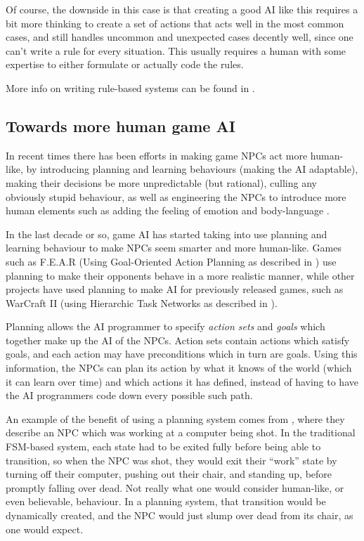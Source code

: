 \documentclass[]{report}
\begin{document}
Of course, the downside in this case is that creating a good AI like this
requires a bit more thinking to create a set of actions that acts well in the
most common cases, and still handles uncommon and unexpected cases decently
well, since one can't write a rule for every situation. This usually requires a
human with some expertise to either formulate or actually code the rules.

More info on writing rule-based systems can be found in
\citet[chap.~4]{kirby2011introduction}.

\subsection{Towards more human game AI}
\label{sec:towards-more-human}

In recent times there has been efforts in making game NPCs act more human-like,
by introducing planning and learning behaviours (making the AI adaptable),
making their decisions be more unpredictable (but rational), culling any
obviously stupid behaviour, as well as engineering the NPCs to introduce more
human elements such as adding the feeling of emotion and body-language
\citep{spronck2005adaptive}.

In the last decade or so, game AI has started taking into use planning and
learning behaviour to make NPCs seem smarter and more human-like. Games such as
F.E.A.R (Using Goal-Oriented Action Planning as described in
\citet{orkin2006three}) use planning to make their opponents behave in a more
realistic manner, while other projects have used planning to make AI for
previously released games, such as WarCraft II (using Hierarchic Task Networks
as described in \citet{brickmanhtn}).

Planning allows the AI programmer to specify \emph{action sets} and \emph{goals}
which together make up the AI of the NPCs. Action sets contain actions which
satisfy goals, and each action may have preconditions which in turn are
goals. Using this information, the NPCs can plan its action by what it knows of
the world (which it can learn over time) and which actions it has defined,
instead of having to have the AI programmers code down every possible such path.

An example of the benefit of using a planning system comes from
\citet{orkin2006three}, where they describe an NPC which was working at a
computer being shot. In the traditional FSM-based system, each state had to be
exited fully before being able to transition, so when the NPC was shot, they
would exit their ``work'' state by turning off their computer, pushing out their
chair, and standing up, before promptly falling over dead. Not really what one
would consider human-like, or even believable, behaviour. In a planning system,
that transition would be dynamically created, and the NPC would just slump over
dead from its chair, as one would expect.
\end{document}
